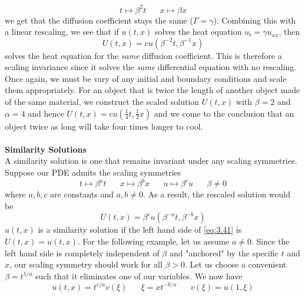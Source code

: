 \documentclass{article}
\numberwithin{equation}{section}
\begin{document}
\begin{equation*}
    t\mapsto \beta^2t \hspace{20pt} x\mapsto \beta x
\end{equation*}
we get that the diffusion coefficient stays the same ($\Gamma =\gamma$). Combining this with a linear rescaling, we see that if $u(t,x)$ solves the heat equation $u_t = \gamma u_{xx}$, then 
\begin{equation}
    U(t,x) = cu(\beta^{-2}t, \beta^{-1}x)
\end{equation}
solves the heat equation for the \textit{same} diffusion coefficient. This is therefore a scaling invariance since it solves the \textit{same} differential equation with no rescaling. Once again, we must be vary of any initial and boundary conditions and scale them appropriately. For an object that is twice the length of another object made of the same material, we construct the scaled solution $U(t,x)$ with $\beta = 2$ and $\alpha =4$ and hence $U(t,x) = cu(\frac{1}{4}t, \frac{1}{2}x)$ and we come to the conclusion that an object twice as long will take four times longer to cool. \\ \\
\textbf{Similarity Solutions}\\
A similarity solution is one that remains invariant under any scaling symmetries. Suppose our PDE admits the scaling symmetries
\begin{equation}
    t\mapsto\beta^at \hspace{20pt} x\mapsto\beta^bx \hspace{20pt} u\mapsto\beta^cu \hspace{20pt}\beta\neq 0
\end{equation}
where $a,b,c$ are constants and $a,b \neq0$. As a result, the rescaled solution would be 
\begin{equation}
    U(t,x) = \beta^cu(\beta^{-a}t,\beta^{-b}x) \label{eq:3.41}
\end{equation}
$u(t,x)$ is a similarity solution if the left hand side of \eqref{eq:3.41} is $U(t,x) = u(t,x)$. For the following example, let us assume $a\neq 0$. Since the left hand side is completely independent of $\beta$ and "anchored" by the specific $t$ and $x$, our scaling symmetry should work for all $\beta > 0$. Let us choose a convenient $\beta = t^{1/a}$ such that it eliminates one of our variables. We now have 
\begin{equation}
    u(t,x) =t^{c/a}v(\xi) \hspace{20pt} \xi = xt^{-b/a} \hspace{20pt} v(\xi) = u(1,\xi) \label{eq:3.42}
\end{equation}
\end{document}
